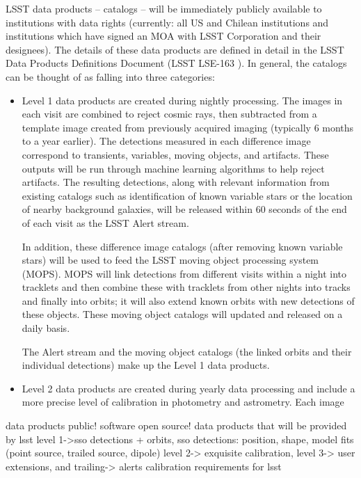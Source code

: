 \documentclass{iau}
\begin{document}
LSST data products -- catalogs -- will be immediately publicly available to
institutions with data rights (currently: all US and Chilean
institutions and institutions which have signed an MOA with LSST
Corporation and their designees).  The details of these data products
are defined in detail in the LSST Data Products Definitions Document
(LSST LSE-163 \cite{LSST_DPDD}). In general, the catalogs can be
thought of as falling into three categories:
\begin{itemize}
\item Level 1 data products are created during nightly
  processing. The images in each visit are combined to reject cosmic
rays, then subtracted from a template image created from previously
acquired imaging (typically 6 months to a year earlier). The
detections measured in each difference image correspond to transients,
variables, moving objects, and artifacts. These outputs will be run
through machine learning algorithms to help reject artifacts. The
resulting detections, along with relevant information from existing
catalogs such as identification of known variable stars or the
location of nearby background galaxies, will be released within 60
seconds of the end of each visit as the LSST Alert stream.

In addition, these difference image catalogs (after removing known
variable stars) will be used to feed the LSST moving object processing
system (MOPS). MOPS will link detections from different visits within
a night into tracklets and then combine these with tracklets from
other nights into tracks and finally into orbits; it will also extend known
orbits with new detections of these objects. These moving object
catalogs will updated and released on a daily basis.

The Alert stream and the moving object catalogs (the linked orbits and
their individual detections) make up the Level 1 data products.

\item Level 2 data products are created during yearly data processing
  and include a more precise level of calibration in photometry and
  astrometry. Each image 
\end{itemize}
data products public! software open source!
data products that will be provided by lsst
level 1->sso detections + orbits,
  sso detections: position, shape, model fits (point source, trailed
  source, dipole)
level 2-> exquisite calibration, 
level 3-> user extensions, 
and trailing-> alerts
calibration requirements for lsst
\end{document}
